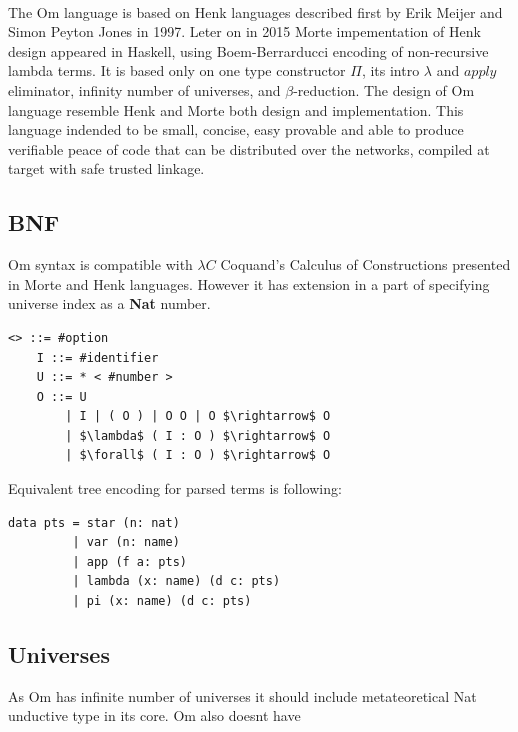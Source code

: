 \documentclass[11pt,oneside]{article}
\begin{document}
\paragraph{}
The Om language is based on Henk\cite{henk} languages described first
by Erik Meijer and Simon Peyton Jones in 1997. Leter on in 2015 Morte impementation
of Henk design appeared in Haskell, using Boem-Berrarducci encoding of non-recursive lambda terms.
It is based only on one type constructor $\Pi$, its intro $\lambda$ and $apply$ eliminator,
infinity number of universes, and $\beta$-reduction. The design of Om language resemble
Henk and Morte both design and implementation. This language indended to be small,
concise, easy provable and able to produce verifiable peace of code that can be
distributed over the networks, compiled at target with safe trusted linkage.

\newpage

\subsection{BNF}

Om syntax is compatible with $\lambda C$ Coquand's Calculus of Constructions presented
in Morte and Henk languages. However it has extension in a part of specifying
universe index as a {\bf Nat} number.

\vspace{0.5cm}
\begin{lstlisting}[mathescape=true]
   <> ::= #option
    I ::= #identifier
    U ::= * < #number >
    O ::= U
        | I | ( O ) | O O | O $\rightarrow$ O
        | $\lambda$ ( I : O ) $\rightarrow$ O
        | $\forall$ ( I : O ) $\rightarrow$ O
\end{lstlisting}

Equivalent tree encoding for parsed terms is following:
\vspace{0.5cm}
\begin{lstlisting}[mathescape=true]
data pts = star (n: nat)
         | var (n: name)
         | app (f a: pts)
         | lambda (x: name) (d c: pts)
         | pi (x: name) (d c: pts)
\end{lstlisting}

\subsection{Universes}

As Om has infinite number of universes it should include metateoretical Nat
unductive type in its core. Om also doesnt have 
\end{document}
